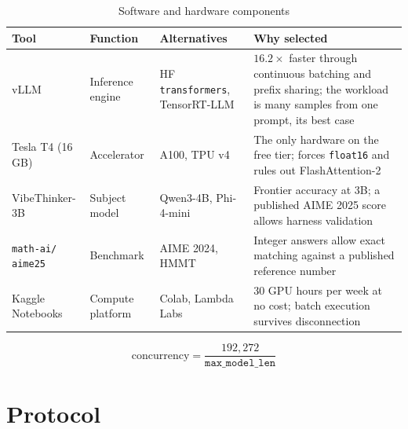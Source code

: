 \documentclass[12pt,a4paper,oneside]{report}
\newif\ifdraft
\newcommand{\writehere}[2]{%
  \ifdraft
    \begin{tcolorbox}[colback=yellow!8,colframe=orange!55,
                      boxrule=0.6pt,left=6pt,right=6pt,top=4pt,bottom=4pt]
    {\small\textbf{WRITE: #1}\\[2pt]#2}
    \end{tcolorbox}
  \fi}
\begin{document}
\begin{table}[htbp]
\centering
\caption{Software and hardware components}
\label{tab:tools}
\small
\begin{tabular}{@{}L{2.3cm}L{3.5cm}L{3.0cm}L{5.6cm}@{}}
\toprule
\textbf{Tool} & \textbf{Function} & \textbf{Alternatives} & \textbf{Why selected} \\
\midrule
vLLM & Inference engine & HF \texttt{transformers}, TensorRT-LLM &
$16.2\times$ faster through continuous batching and prefix sharing; the workload
is many samples from one prompt, its best case \\
\addlinespace
Tesla T4 (16\,GB) & Accelerator & A100, TPU v4 & The only hardware on the free
tier; forces \texttt{float16} and rules out FlashAttention-2 \\
\addlinespace
VibeThinker-3B & Subject model & Qwen3-4B, Phi-4-mini & Frontier accuracy at 3B;
a published AIME 2025 score allows harness validation \\
\addlinespace
\texttt{math-ai/} \texttt{aime25} & Benchmark & AIME 2024, HMMT & Integer answers
allow exact matching against a published reference number \\
\addlinespace
Kaggle Notebooks & Compute platform & Colab, Lambda Labs & 30 GPU hours per week
at no cost; batch execution survives disconnection \\
\bottomrule
\end{tabular}
\end{table}

\writehere{1 paragraph on the T4 constraints}{
Three consequences of the card being Turing, compute capability 7.5.
FlashAttention-2 needs 8.0 or above so vLLM falls back to a Triton backend.
bfloat16 is unsupported so float16 is mandatory. And the KV cache holds 192,272
tokens at 90 percent utilisation, so concurrency is that divided by the context
window, Equation \eqref{eq:concurrency}, which is why a 32k context sustained 60 to
71 tokens per second while an 8k context sustained 246.}

\begin{equation}
\text{concurrency} = \frac{192{,}272}{\texttt{max\_model\_len}}
\label{eq:concurrency}
\end{equation}

\section{Protocol}

\writehere{2 paragraphs}{
One: the controls. Decoding parameters frozen across every arm, temperature 1.0,
top\_p 0.95, seed 0, $K$ equals 4 giving 120 samples per condition. Prompt from the
model's own chat template. Answer extraction finds the final boxed expression with
a brace depth parser. One shared implementation across all arms so a change cannot
apply to only one condition. Budgets of 4,096, 8,192, 16,384 and 32,768 tokens.
\\[4pt]
Two: termination logging, and why it is the important part. Distinguishing a wrong
answer from an absent one is what makes Equation \eqref{eq:hypotheses} testable.
Aggregate accuracy alone cannot support the central claim, which is why the harness
records the stop reason for every sample.}
\end{document}

